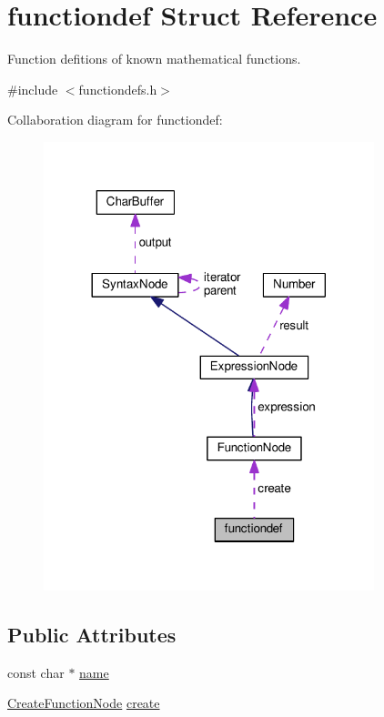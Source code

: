 \hypertarget{structfunctiondef}{}\section{functiondef Struct Reference}
\label{structfunctiondef}


Function defitions of known mathematical functions.  




{\ttfamily \#include $<$functiondefs.\+h$>$}



Collaboration diagram for functiondef\+:\nopagebreak
\begin{figure}[H]
\begin{center}
\leavevmode
\includegraphics[width=272pt]{structfunctiondef__coll__graph}
\end{center}
\end{figure}
\subsection*{Public Attributes}
\begin{DoxyCompactItemize}
\item 
const char $\ast$ \hyperlink{structfunctiondef_ae17adb6289e2da9d1b68824afe49d210}{name}
\item 
\hyperlink{functiondefs_8h_afdc10d17fe34c7cad02104a3607b2c28}{Create\+Function\+Node} \hyperlink{structfunctiondef_a323f2d4c5ae5923f8f76c76b3c77b42e}{create}
\end{DoxyCompactItemize}


